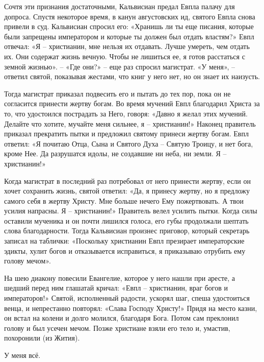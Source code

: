Сочтя эти признания достаточными, Кальвисиан предал Евпла палачу для допроса.
Спустя некоторое время, в канун августовских ид, святого Евпла снова привели в
суд. Кальвисиан спросил его: «Хранишь ли ты еще писания, которые были запрещены
императором и которые ты должен был отдать властям?» Евпл отвечал: «Я –
христианин, мне нельзя их отдавать. Лучше умереть, чем отдать их. Они содержат
жизнь вечную. Чтобы не лишиться ее, я готов расстаться с земной жизнью». – «Где
они?» – еще раз спросил магистрат. «У меня», – ответил святой, показывая
жестами, что книг у него нет, но он знает их наизусть.

Тогда магистрат приказал подвесить его и пытать до тех пор, пока он не
согласится принести жертву богам. Во время мучений Евпл благодарил Христа за
то, что удостоился пострадать за Него, говоря: «Давно я желал этих мучений.
Делайте что хотите, мучайте меня сильнее, я – христианин!» Наконец правитель
приказал прекратить пытки и предложил святому принеси жертву богам. Евпл
ответил: «Я почитаю Отца, Сына и Святого Духа – Святую Троицу, и нет бога,
кроме Нее. Да разрушатся идолы, не создавшие ни неба, ни земли. Я –
христианин!»

Когда магистрат в последний раз потребовал от него принести жертву, если он
хочет сохранить жизнь, святой ответил: «Да, я принесу жертву, но я предложу
самого себя в жертву Христу. Мне больше нечего Ему пожертвовать. А твои усилия
напрасны. Я – христианин!» Правитель велел усилить пытки. Когда силы оставили
мученика и он почти лишился голоса, его губы продолжали шептать слова
благодарности. Тогда Кальвисиан произнес приговор, который секретарь записал на
таблички: «Поскольку христианин Евпл презирает императорские эдикты, хулит
богов и отказывается исправиться, я приказываю отрубить ему голову мечом».

На шею диакону повесили Евангелие, которое у него нашли при аресте, а шедший
перед ним глашатай кричал: «Евпл – христианин, враг богов и императоров!»
Святой, исполненный радости, ускорял шаг, спеша удостоиться венца, и
непрестанно повторял: «Слава Господу Христу!» Придя на место казни, он встал на
колени и долго молился, благодаря Бога. Потом сам преклонил голову и был усечен
мечом. Позже христиане взяли его тело и, умастив, похоронили (из Жития).

У меня всё.
